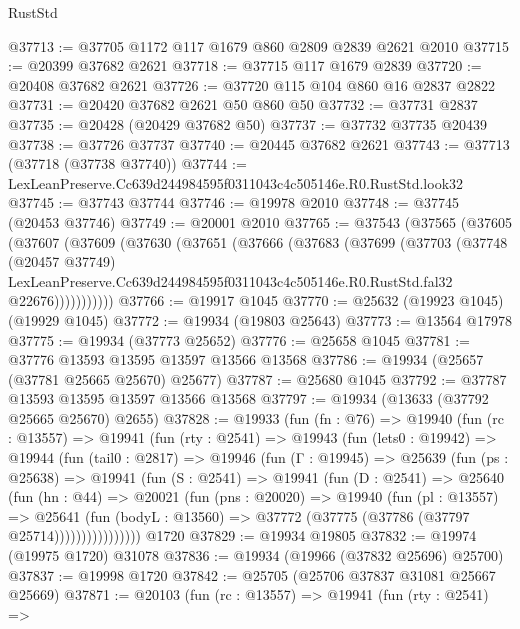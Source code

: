 \begin{lexlean}{RustStd}
\begin{coremodule}
@37713 := @37705 @1172 @117 @1679 @860 @2809 @2839 @2621 @2010
@37715 := @20399 @37682 @2621
@37718 := @37715 @117 @1679 @2839
@37720 := @20408 @37682 @2621
@37726 := @37720 @115 @104 @860 @16 @2837 @2822
@37731 := @20420 @37682 @2621 @50 @860 @50
@37732 := @37731 @2837
@37735 := @20428 (@20429 @37682 @50)
@37737 := @37732 @37735 @20439
@37738 := @37726 @37737
@37740 := @20445 @37682 @2621
@37743 := @37713 (@37718 (@37738 @37740))
@37744 := LexLeanPreserve.Cc639d244984595f0311043c4c505146e.R0.RustStd.look32
@37745 := @37743 @37744
@37746 := @19978 @2010
@37748 := @37745 (@20453 @37746)
@37749 := @20001 @2010
@37765 := @37543
    (@37565
      (@37605
        (@37607
          (@37609
            (@37630
              (@37651
                (@37666
                  (@37683
                    (@37699
                      (@37703
                        (@37748
                          (@20457 @37749)
                          LexLeanPreserve.Cc639d244984595f0311043c4c505146e.R0.RustStd.fal32
                          @22676)))))))))))
@37766 := @19917 @1045
@37770 := @25632 (@19923 @1045) (@19929 @1045)
@37772 := @19934 (@19803 @25643)
@37773 := @13564 @17978
@37775 := @19934 (@37773 @25652)
@37776 := @25658 @1045
@37781 := @37776 @13593 @13595 @13597 @13566 @13568
@37786 := @19934 (@25657 (@37781 @25665 @25670) @25677)
@37787 := @25680 @1045
@37792 := @37787 @13593 @13595 @13597 @13566 @13568
@37797 := @19934 (@13633 (@37792 @25665 @25670) @2655)
@37828 := @19933
    (fun (fn : @76) =>
    @19940
      (fun (rc : @13557) =>
      @19941
        (fun (rty : @2541) =>
        @19943
          (fun (lets0 : @19942) =>
          @19944
            (fun (tail0 : @2817) =>
            @19946
              (fun (Γ : @19945) =>
              @25639
                (fun (ps : @25638) =>
                @19941
                  (fun (S : @2541) =>
                  @19941
                    (fun (D : @2541) =>
                    @25640
                      (fun (hn : @44) =>
                      @20021
                        (fun (pns : @20020) =>
                        @19940
                          (fun (pl : @13557) =>
                          @25641
                            (fun (bodyL : @13560) =>
                            @37772 (@37775 (@37786 (@37797 @25714))))))))))))))))
    @1720
@37829 := @19934 @19805
@37832 := @19974 (@19975 @1720) @31078
@37836 := @19934 (@19966 (@37832 @25696) @25700)
@37837 := @19998 @1720
@37842 := @25705 (@25706 @37837 @31081 @25667 @25669)
@37871 := @20103
    (fun (rc : @13557) =>
    @19941
      (fun (rty : @2541) =>

\end{coremodule}
\end{lexlean}
